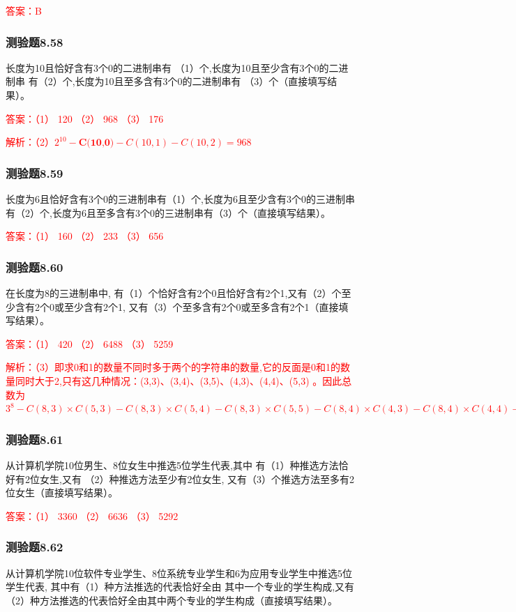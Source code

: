 \documentclass[UTF8, heading=true]{ctexart}
\begin{document}
\textcolor{red}{答案：B}

\subsubsection{测验题8.58}

长度为10且恰好含有3个0的二进制串有
（1）个,长度为10且至少含有3个0的二进制串
有（2）个,长度为10且至多含有3个0的二进制串有
（3）个（直接填写结果）。

\textcolor{red}{答案：（1） 120 （2） 968 （3） 176}

\textcolor{red}{解析：（2）$2^{10}-\textbf{C(10,0)}-C(10,1)-C(10,2)=968$}

\subsubsection{测验题8.59}

长度为6且恰好含有3个0的三进制串有（1）个,长度为6且至少含有3个0的三进制串有（2）个,长度为6且至多含有3个0的三进制串有（3）个（直接填写结果）。

\textcolor{red}{答案：（1） 160 （2） 233 （3） 656}

\subsubsection{测验题8.60}

在长度为8的三进制串中,
有（1）个恰好含有2个0且恰好含有2个1,又有（2）个至少含有2个0或至少含有2个1,
又有（3）个至多含有2个0或至多含有2个1（直接填写结果）。

\textcolor{red}{答案：（1） 420 （2） 6488 （3） 5259}

\textcolor{red}{解析：（3）即求0和1的数量不同时多于两个的字符串的数量,它的反面是0和1的数量同时大于2,只有这几种情况：(3,3)、(3,4)、(3,5)、(4,3)、(4,4)、(5,3)
。因此总数为$3^8-C(8,3)\times C(5,3)-C(8,3)\times C(5,4)-C(8,3)\times C(5,5)-C(8,4)\times C(4,3)-C(8,4)\times C(4,4)-C(8,5)\times C(3,3)=5259$}


\subsubsection{测验题8.61}

从计算机学院10位男生、8位女生中推选5位学生代表,其中
有（1）种推选方法恰好有2位女生,又有
（2）种推选方法至少有2位女生,
又有（3）个推选方法至多有2位女生（直接填写结果）。

\textcolor{red}{答案：（1） 3360 （2） 6636 （3） 5292}

\subsubsection{测验题8.62}
从计算机学院10位软件专业学生、8位系统专业学生和6为应用专业学生中推选5位学生代表,
其中有（1）种方法推选的代表恰好全由
其中一个专业的学生构成,又有（2）种方法推选的代表恰好全由其中两个专业的学生构成（直接填写结果）。
\end{document}
